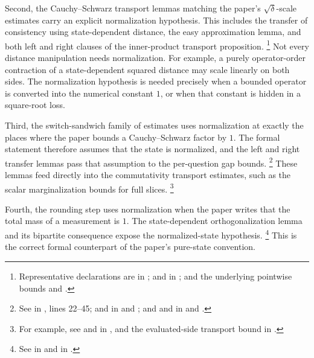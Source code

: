 \documentclass[11pt]{article}
\begin{document}
Second, the Cauchy--Schwarz transport lemmas matching the paper's
$\sqrt\delta$-scale estimates carry an explicit normalization hypothesis.
This includes the transfer of consistency using state-dependent distance, the
easy approximation lemma, and both left and right clauses of the inner-product
transport proposition.
\footnote{Representative declarations are  in
;
 and  in
; and the underlying
pointwise bounds  and
.}
Not every distance manipulation needs normalization. For example, a purely
operator-order contraction of a state-dependent squared distance may scale
linearly on both sides. The normalization hypothesis is needed precisely when a
bounded operator is converted into the numerical constant $1$, or when that
constant is hidden in a square-root loss.

Third, the switch-sandwich family of estimates uses normalization at exactly the
places where the paper bounds a Cauchy--Schwarz factor by $1$. The formal
statement therefore assumes that the state is normalized, and the left and right
transfer lemmas pass that assumption to the per-question gap bounds.
\footnote{See  in
, lines
22--45;  and 
in  and
; and
 and 
in  and
.}
These lemmas feed directly into the commutativity transport estimates, such as
the scalar marginalization bounds for full slices.
\footnote{For example, see  and
 in
,
and the evaluated-side transport bound
 in
.}

Fourth, the rounding step uses normalization when the paper writes that the
total mass of a measurement is $1$.  The state-dependent orthogonalization
lemma and its bipartite consequence expose the normalized-state hypothesis.
\footnote{See  in
and  in
.}
This is the correct formal counterpart of the paper's pure-state convention.
\end{document}

